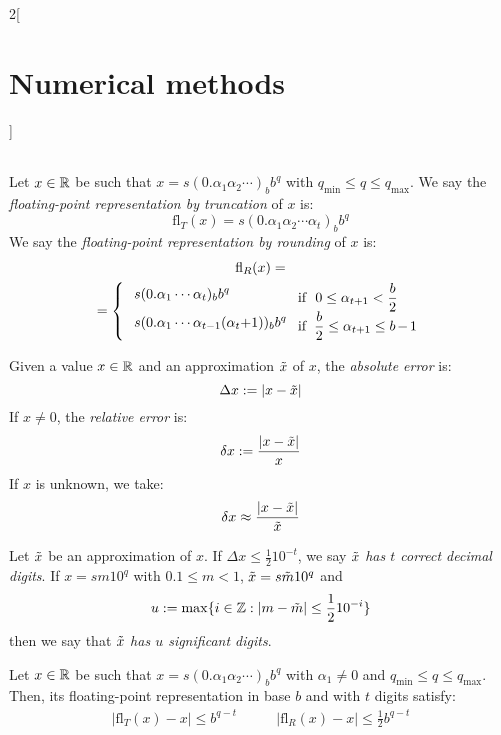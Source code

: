\documentclass[../../../main_math.tex]{subfiles}
\begin{document}
\begin{multicols}{2}[\section{Numerical methods}]
\begin{center}
\begin{minipage}{\linewidth}
\begin{tabular}{c|ccccc}
      \end{tabular}
    \end{minipage}
  \end{center}
  \begin{definition}
    Let $x\in\mathbb{R}$ be such that $x=s(0.\alpha_1\alpha_2\cdots)_bb^q$ with $q_\text{min}\leq q\leq q_\text{max}$. We say the \emph{floating-point representation by truncation} of $x$ is: $$\text{fl}_T(x)=s(0.\alpha_1\alpha_2\cdots\alpha_t)_bb^q$$ We say the \emph{floating-point representation by rounding} of $x$ is:
    \begin{multline*}
      \text{fl}_R(x)=\\=\left\{\text{\setlength{\tabcolsep}{4pt}
        \begin{tabular}{m{3.85cm}m{3cm}}
          $s(0.\alpha_1\cdots\alpha_t)_bb^q$                 & if $\ 0\leq\alpha_{t+1}<\frac{b}{2}$       \\
          $s(0.\alpha_1\cdots\alpha_{t-1}(\alpha_t+1))_bb^q$ & if $\ \frac{b}{2}\leq\alpha_{t+1}\leq b-1$
        \end{tabular}}\right.
    \end{multline*}
  \end{definition}
  \begin{definition}
    Given a value $x\in\mathbb{R}$ and an approximation $\Tilde{x}$ of $x$, the \emph{absolute error} is: $$\Delta x:=|x-\Tilde{x}|$$ If $x\ne 0$, the \emph{relative error} is: $$\delta x:=\frac{|x-\Tilde{x}|}{x}$$ If $x$ is unknown, we take: $$\delta x\approx\frac{|x-\Tilde{x}|}{\Tilde{x}}$$
  \end{definition}
  \begin{definition}
    Let $\Tilde{x}$ be an approximation of $x$. If $\Delta x\leq\frac{1}{2}10^{-t}$, we say $\Tilde{x}$ \emph{has $t$ correct decimal digits}. If $x=sm10^q$ with $0.1\leq m<1$, $\Tilde{x}=s\Tilde{m}10^q$ and $$u:=\max\{i\in\mathbb{Z}:|m-\Tilde{m}|\leq\frac{1}{2}10^{-i}\}$$ then we say that $\Tilde{x}$ \emph{has $u$ significant digits}.
  \end{definition}
  \begin{proposition}
    Let $x\in\mathbb{R}$ be such that $x=s(0.\alpha_1\alpha_2\cdots)_bb^q$ with $\alpha_1\ne0$ and $q_\text{min}\leq q\leq q_\text{max}$. Then, its floating-point representation in base $b$ and with $t$ digits satisfy:
    \begin{align*}
      \left|\text{fl}_T(x)-x\right|\leq b^{q-t}\quad           & \quad \left|\text{fl}_R(x)-x\right|\leq\frac{1}{2}b^{q-t}           \\

\end{align*}
\end{proposition}
\end{multicols}
\end{document}
